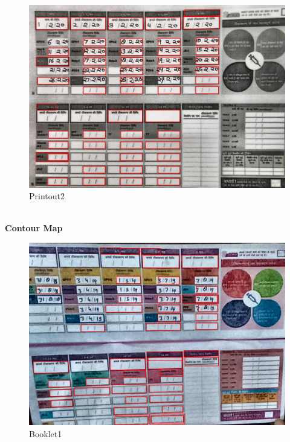 \documentclass{article}
\begin{document}
    \begin{figure}[!htb]
    \minipage{\textwidth}
    \begin{center}
      \includegraphics[scale=.25]{4/.report/_segmented/_cont/p2.jpg}
      \caption{Printout2}
    \end{center}
    \endminipage
    \end{figure}
\pagebreak \\
\textbf{Contour Map}
    \begin{figure}[!htb]
    \minipage{\textwidth}
    \begin{center}
      \includegraphics[scale=.25]{4/.report/_segmented/_cont/b1.jpg}
      \caption{Booklet1}
    \end{center}
    \endminipage
    \end{figure}
\end{document}
